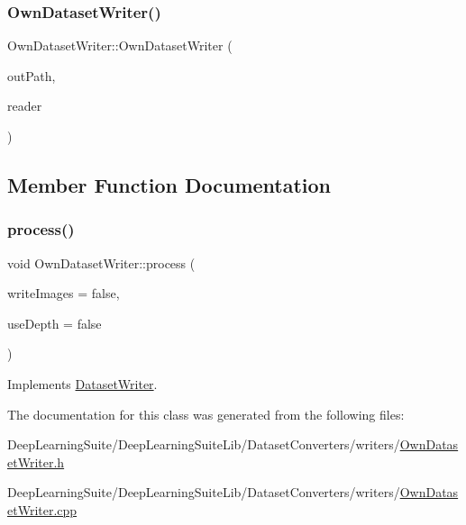 \subsubsection{\texorpdfstring{Own\+Dataset\+Writer()}{OwnDatasetWriter()}}
{\footnotesize\ttfamily Own\+Dataset\+Writer\+::\+Own\+Dataset\+Writer (\begin{DoxyParamCaption}\item[{const std\+::string \&}]{out\+Path,  }\item[{\hyperlink{_dataset_reader_8h_a30d89cba514a220d64d04535c0465f1c}{Dataset\+Reader\+Ptr} \&}]{reader }\end{DoxyParamCaption})}



\subsection{Member Function Documentation}
\mbox{\label{class_own_dataset_writer_a63b35dd2752ea15af5ab5b25693d135c}} 
\subsubsection{\texorpdfstring{process()}{process()}}
{\footnotesize\ttfamily void Own\+Dataset\+Writer\+::process (\begin{DoxyParamCaption}\item[{bool}]{write\+Images = {\ttfamily false},  }\item[{bool}]{use\+Depth = {\ttfamily false} }\end{DoxyParamCaption})\hspace{0.3cm}{\ttfamily [virtual]}}



Implements \hyperlink{class_dataset_writer_a97270b2e182e6c08d9342d8db42710fd}{Dataset\+Writer}.



The documentation for this class was generated from the following files\+:\begin{DoxyCompactItemize}
\item 
Deep\+Learning\+Suite/\+Deep\+Learning\+Suite\+Lib/\+Dataset\+Converters/writers/\hyperlink{_own_dataset_writer_8h}{Own\+Dataset\+Writer.\+h}\item 
Deep\+Learning\+Suite/\+Deep\+Learning\+Suite\+Lib/\+Dataset\+Converters/writers/\hyperlink{_own_dataset_writer_8cpp}{Own\+Dataset\+Writer.\+cpp}\end{DoxyCompactItemize}
